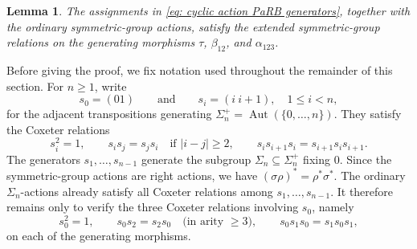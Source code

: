 \documentclass{amsart}
\newcommand{\twist}{\tau}
\newtheorem{lemma}[theorem]{Lemma}%
\theoremstyle{definition}
\numberwithin{equation}{section}
\begin{document}
\begin{lemma}
\label{lemma: extended symmetric action on generators}
The assignments in \eqref{eq: cyclic action PaRB generators},
together with the ordinary symmetric-group actions, satisfy the
extended symmetric-group relations on the generating morphisms
$\twist$, $\beta_{12}$, and $\alpha_{123}$.
\end{lemma}

Before giving the proof, we fix notation used throughout the remainder of this section. For $n \geq 1$, write
\[
s_0 = (01)
\qquad\text{and}\qquad
s_i = (i\ i+1), \quad 1 \leq i < n,
\]
for the adjacent transpositions generating $\Sigma_n^+ = \operatorname{Aut}(\{0,\ldots,n\})$. They satisfy the
Coxeter relations
\[
s_i^2 = 1, \qquad
s_i s_j = s_j s_i \quad \text{if } |i-j| \geq 2, \qquad
s_i s_{i+1} s_i = s_{i+1} s_i s_{i+1}.
\]
The generators $s_1, \ldots, s_{n-1}$ generate the subgroup $\Sigma_n \subseteq \Sigma_n^+$ fixing $0$. Since the
symmetric-group actions are right actions, we have $(\sigma\rho)^* = \rho^*\sigma^*$. The ordinary $\Sigma_n$-actions
already satisfy all Coxeter relations among $s_1, \ldots, s_{n-1}$. It therefore remains only to verify the three Coxeter relations involving $s_0$, namely
\[
s_0^2 = 1, \qquad
s_0 s_2 = s_2 s_0 \quad \text{(in arity } \geq 3\text{)},
\qquad
s_0 s_1 s_0 = s_1 s_0 s_1,
\]
on each of the generating morphisms.
\end{document}
